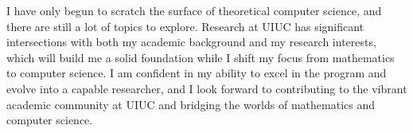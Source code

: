\documentclass[12pt]{article}
\begin{document}
I have only begun to scratch the surface of theoretical computer science, and there are still a lot
of topics to explore. Research at UIUC has significant intersections with both my academic
background and my research interests, which will build me a solid foundation while I shift my focus
from mathematics to computer science. I am confident in my ability to excel in the program and
evolve into a capable researcher, and I look forward to contributing to the vibrant academic
community at UIUC and bridging the worlds of mathematics and computer science.

\newpage



\end{document}
